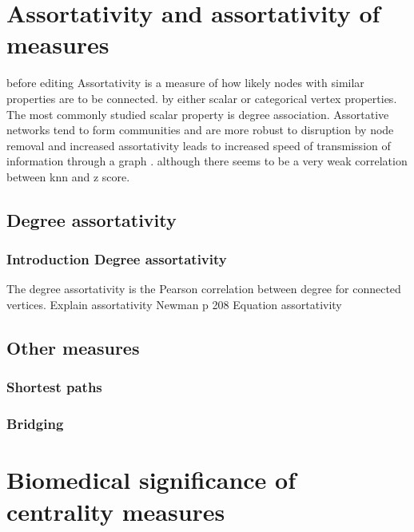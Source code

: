 \section{Assortativity and assortativity of measures}
before editing
Assortativity is a measure of how likely nodes with similar properties are to be connected. \cite{newman2002assortative} by either scalar or categorical vertex properties. The most commonly studied scalar property is degree association. Assortative networks tend to form communities and are more robust to disruption by node removal  \cite{newman2002assortative} and increased assortativity leads to increased speed of transmission of information through a graph \cite{noldus2015assortativity}.  although there seems to be a very weak correlation between knn and z score. 
\subsection{Degree assortativity}
\label{sec:degree assortativity}
\subsubsection{Introduction Degree assortativity}
The degree assortativity is the Pearson correlation between degree for connected vertices.\cite{noldus2015assortativity} Explain assortativity
Newman p 208
Equation assortativity


\subsection{Other measures}
\subsubsection{Shortest paths}


\subsubsection{Bridging}

\cite{valente2010bridging}



\section{Biomedical significance of centrality measures}

